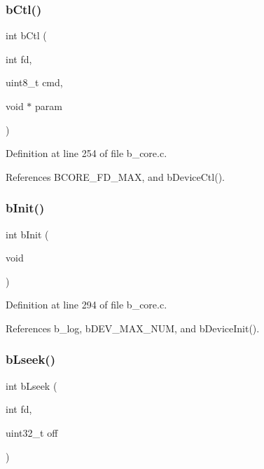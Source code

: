 \subsubsection{\texorpdfstring{b\+Ctl()}{bCtl()}}
{\footnotesize\ttfamily int b\+Ctl (\begin{DoxyParamCaption}\item[{int}]{fd,  }\item[{uint8\+\_\+t}]{cmd,  }\item[{void $\ast$}]{param }\end{DoxyParamCaption})}



Definition at line 254 of file b\+\_\+core.\+c.



References B\+C\+O\+R\+E\+\_\+\+F\+D\+\_\+\+M\+AX, and b\+Device\+Ctl().

\mbox{\label{group___c_o_r_e___exported___functions_gad02e8fddcae0585773c027e81bba5f2c}} 
\subsubsection{\texorpdfstring{b\+Init()}{bInit()}}
{\footnotesize\ttfamily int b\+Init (\begin{DoxyParamCaption}\item[{void}]{ }\end{DoxyParamCaption})}



Definition at line 294 of file b\+\_\+core.\+c.



References b\+\_\+log, b\+D\+E\+V\+\_\+\+M\+A\+X\+\_\+\+N\+UM, and b\+Device\+Init().

\mbox{\label{group___c_o_r_e___exported___functions_gad49412624e7b58f0b90ff43e60823eb1}} 
\subsubsection{\texorpdfstring{b\+Lseek()}{bLseek()}}
{\footnotesize\ttfamily int b\+Lseek (\begin{DoxyParamCaption}\item[{int}]{fd,  }\item[{uint32\+\_\+t}]{off }\end{DoxyParamCaption})}




